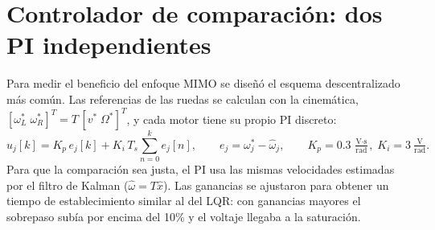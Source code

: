\documentclass[11pt,letterpaper]{article}
\begin{document}
\section{Controlador de comparación: dos PI independientes}
Para medir el beneficio del enfoque MIMO se diseñó el esquema descentralizado más común. Las referencias de las ruedas se calculan con la cinemática, $[\omega_L^*\;\omega_R^*]^T = T\,[v^*\;\Omega^*]^T$, y cada motor tiene su propio PI discreto:
\begin{equation}
  u_j[k] = K_p\, e_j[k] + K_i\, T_s \sum_{n=0}^{k} e_j[n], \qquad e_j = \omega_j^* - \hat\omega_j,\qquad K_p = 0.3~\tfrac{\text{V$\cdot$s}}{\text{rad}},\; K_i = 3~\tfrac{\text{V}}{\text{rad}}.
\end{equation}
Para que la comparación sea justa, el PI usa las mismas velocidades estimadas por el filtro de Kalman ($\hat\omega = T\hat x$). Las ganancias se ajustaron para obtener un tiempo de establecimiento similar al del LQR: con ganancias mayores el sobrepaso subía por encima del 10\% y el voltaje llegaba a la saturación.

\end{document}
